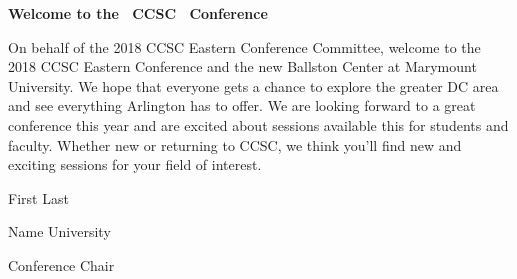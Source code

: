 \documentclass{article}
\begin{document}
\begingroup
  \centering
  \textbf{\LARGE Welcome to the \confYear\ CCSC \confName\ Conference}\\
\endgroup

\vspace{10pt}

On behalf of the 2018 CCSC Eastern Conference Committee, welcome to the 2018
CCSC Eastern Conference and the new Ballston Center at Marymount University.
We hope that everyone gets a chance to explore the greater DC area and see
everything Arlington has to offer. We are looking forward to a great conference
this year and are excited about sessions available this for students and
faculty. Whether new or returning to CCSC, we think you’ll find new and
exciting sessions for your field of interest.

\vspace{10pt}

\hfill First Last

\hfill Name University

\hfill Conference Chair
\end{document}
